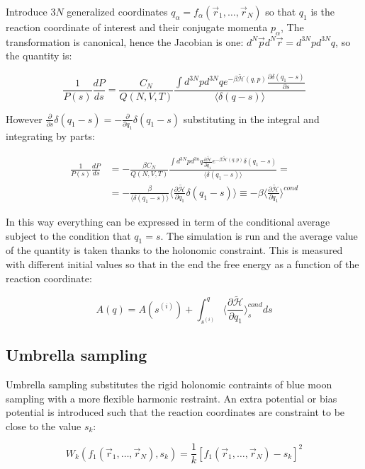 	Introduce $3N$ generalized coordinates $q_\alpha = f_\alpha(\vec{r}_1, \dots, \vec{r}_N)$ so that $q_1$ is the reaction coordinate of interest and their conjugate momenta $p_\alpha$,
	The transformation is canonical, hence the Jacobian is one: $d^N\vec{p}d^N\vec{r} = d^{3N}pd^{3N}q$, so the quantity is:

	$$\frac{1}{P(s)}\frac{dP}{ds} = \frac{C_N}{Q(N, V, T)}\frac{\int d^{3N}pd^{3N}qe^{-\beta\tilde{\mathcal{H}}(q, p)}\frac{\partial\delta(q_1-s)}{\partial s}}{\langle\delta(q-s)\rangle}$$

	However $\frac{\partial}{\partial s}\delta(q_1-s) = -\frac{\partial}{\partial q_1}\delta(q_1-s)$ substituting in the integral and integrating by parts:

	\begin{align*}
		\frac{1}{P(s)}\frac{dP}{ds} &=-\frac{\beta C_N}{Q(N, V, T)}\frac{\int d^{3N}pd^{3n}q\frac{\partial\tilde{\mathcal{H}}}{\partial q_1}e^{-\beta\tilde{\mathcal{H}}(q, p)}\delta(q_1-s)}{\langle\delta(q_1-s)\rangle} = \\
																&= -\frac{\beta}{\langle\delta(q_1-s)\rangle}\biggl\langle\frac{\partial\tilde{\mathcal{H}}}{\partial q_1}\delta(q_1-s)\biggr\rangle \equiv -\beta\biggl\langle\frac{\partial\tilde{\mathcal{H}}}{\partial q_1}\biggr\rangle^{cond}
	\end{align*}

	In this way everything can be expressed in term of the conditional average subject to the condition that $q_1=s$.
	The simulation is run and the average value of the quantity is taken thanks to the holonomic constraint.
	This is measured with different initial values so that in the end the free energy as a function of the reaction coordinate:

	$$A(q) = A(s^{(i)}) + \int_{s^{(i)}}^q\biggl\langle\frac{\partial\tilde{\mathcal{H}}}{\partial q_1}\biggr\rangle^{cond}_sds$$

	\subsection{Umbrella sampling}
	Umbrella sampling substitutes the rigid holonomic contraints of blue moon sampling with a more flexible harmonic restraint.
	An extra potential or bias potential is introduced such that the reaction coordinates are constraint to be close to the value $s_k$:

	$$W_k(f_1(\vec{r}_1, \dots, \vec{r}_N), s_k) = \frac{1}{k}[f_1(\vec{r}_1, \dots, \vec{r}_N)-s_k]^2$$

